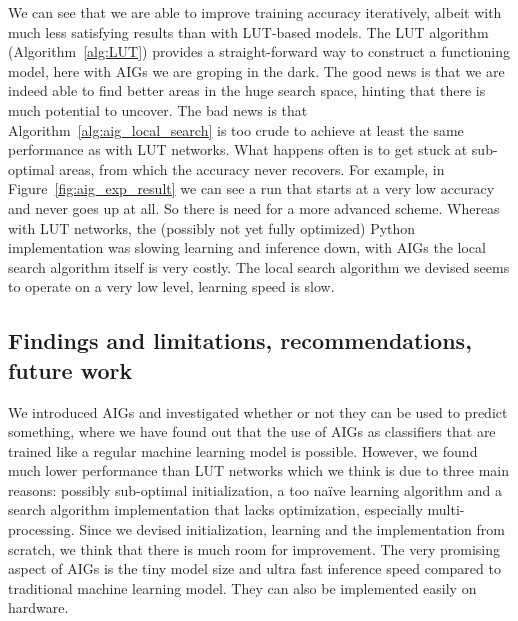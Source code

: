 \noindent We can see that we are able to improve training accuracy iteratively, albeit with much less satisfying results than with LUT-based models. The LUT algorithm (Algorithm~\ref{alg:LUT}) provides a straight-forward way to construct a functioning model, here with AIGs we are groping in the dark. The good news is that we are indeed able to find better areas in the huge search space, hinting that there is much potential to uncover. The bad news is that Algorithm~\ref{alg:aig_local_search} is too crude to achieve at least the same performance as with LUT networks. What happens often is to get stuck at sub-optimal areas, from which the accuracy never recovers. For example, in Figure~\ref{fig:aig_exp_result} we can see a run that starts at a very low accuracy and never goes up at all. So there is need for a more advanced scheme. Whereas with LUT networks, the (possibly not yet fully optimized) Python implementation was slowing learning and inference down, with AIGs the local search algorithm itself is very costly. The local search algorithm we devised seems to operate on a very low level, learning speed is slow.

\subsection{Findings and limitations, recommendations, future work}
We introduced AIGs and investigated whether or not they can be used to predict something, where we have found out that the use of AIGs as classifiers that are trained like a regular machine learning model is possible. However, we found much lower performance than LUT networks which we think is due to three main reasons: possibly sub-optimal initialization, a too naïve learning algorithm and a search algorithm implementation that lacks optimization, especially multi-processing. Since we devised initialization, learning and the implementation from scratch, we think that there is much room for improvement. The very promising aspect of AIGs is the tiny model size and ultra fast inference speed compared to traditional machine learning model. They can also be implemented easily on hardware.

